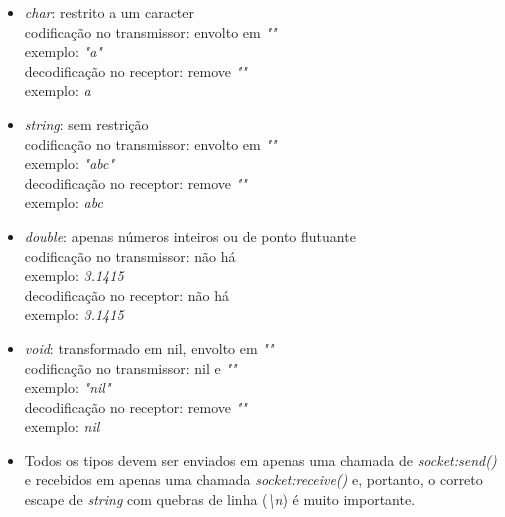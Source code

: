 \documentclass[11pt]{article}
\begin{document}
\begin{itemize}
\item
\textit{char}: restrito a um caracter \\
codificação no transmissor: envolto em \textit{""} \\
exemplo: \textit{"a"} \\
decodificação no receptor: remove \textit{""} \\
exemplo: \textit{a}
\item
\textit{string}: sem restrição \\
codificação no transmissor: envolto em \textit{""} \\
exemplo: \textit{"abc"} \\
decodificação no receptor: remove \textit{""} \\
exemplo: \textit{abc}
\item
\textit{double}: apenas números inteiros ou de ponto flutuante \\
codificação no transmissor: não há \\
exemplo: \textit{3.1415} \\
decodificação no receptor: não há \\
exemplo: \textit{3.1415}
\item
\textit{void}: transformado em nil, envolto em \textit{""} \\
codificação no transmissor: nil e \textit{""} \\
exemplo: \textit{"nil"} \\
decodificação no receptor: remove \textit{""} \\
exemplo: \textit{nil}
\item
Todos os tipos devem ser enviados em apenas uma chamada de
\textit{socket:send()} e recebidos em apenas uma chamada
\textit{socket:receive()} e, portanto, o correto escape de \textit{string} com
quebras de linha (\textit{\textbackslash{}n}) é muito importante.
\end{itemize}
\end{document}
